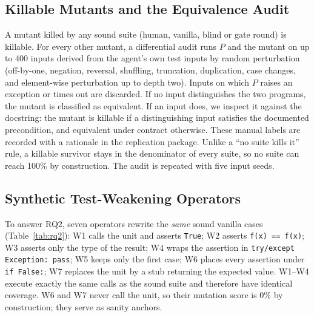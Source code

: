 \documentclass[runningheads]{llncs}
\begin{document}
\begin{table}[t]
\centering
\caption{Mutation operators. Gen.: generated mutants; Killable: after the equivalence audit; Surv.: mutants that no sound suite kills.}\label{tab:ops}
\scriptsize

\end{table}

\subsection{Killable Mutants and the Equivalence Audit}
A mutant killed by any sound suite (human, vanilla, blind or gate round) is killable. For every other mutant, a differential audit runs $P$ and the mutant on up to 400 inputs derived from the agent's own test inputs by random perturbation (off-by-one, negation, reversal, shuffling, truncation, duplication, case changes, and element-wise perturbation up to depth two). Inputs on which $P$ raises an exception or times out are discarded. If no input distinguishes the two programs, the mutant is classified as equivalent. If an input does, we inspect it against the docstring: the mutant is killable if a distinguishing input satisfies the documented precondition, and equivalent under contract otherwise. These manual labels are recorded with a rationale in the replication package. Unlike a ``no suite kills it'' rule, a killable survivor stays in the denominator of every suite, so no suite can reach 100\% by construction. The audit is repeated with five input seeds.

\subsection{Synthetic Test-Weakening Operators}
To answer RQ2, seven operators rewrite the \emph{same} sound vanilla cases (Table~\ref{tab:rq2}): W1 calls the unit and asserts \texttt{True}; W2 asserts \texttt{f(x) == f(x)}; W3 asserts only the type of the result; W4 wraps the assertion in \texttt{try/except Exception: pass}; W5 keeps only the first case; W6 places every assertion under \texttt{if False:}; W7 replaces the unit by a stub returning the expected value. W1--W4 execute exactly the same calls as the sound suite and therefore have identical coverage. W6 and W7 never call the unit, so their mutation score is 0\% by construction; they serve as sanity anchors.
\end{document}
